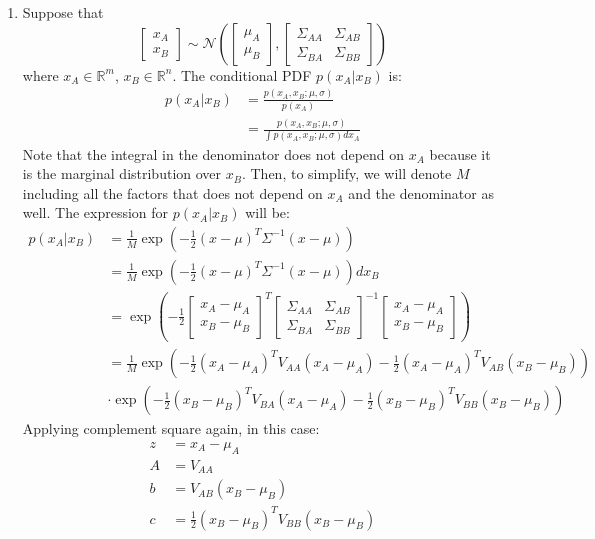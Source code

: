 \documentclass[a4paper, 10pt]{article}  %
\begin{document}
\begin{enumerate}[label=\textbf{(\alph*)}]
    
    \item Suppose that
    \[\left[ \begin{array}{c} x_A \\ x_B \end{array} \right] 
    \sim \mathcal{N} \left( \left[ \begin{array}{c} \mu_A \\ \mu_B \end{array} \right],
    \left[ \begin{array}{cc} \Sigma_{AA} & \Sigma_{AB}\\ \Sigma_{BA} & \Sigma_{BB}\end{array} \right]  \right)\]
    where $x_A \in \mathbb{R}^m$, $x_B \in \mathbb{R}^n$. The conditional PDF  $p(x_A | x_B)$ is:
    \begin{align*}
        p(x_A | x_B) &= \frac{p(x_A, x_B; \mu, \sigma)}{p(x_A)} \\
        &= \frac{p(x_A, x_B; \mu, \sigma)}{\int p(x_A, x_B; \mu, \sigma) d x_A}
    \end{align*}
    Note that the integral in the denominator does not depend on $x_A$ because it is the marginal distribution over $x_B$. Then, to simplify, we will denote $M$ including all the factors that does not depend on $x_A$ and the denominator as well. The expression for $p(x_A | x_B)$ will be:
    \begin{align*}
        p(x_A | x_B) &= \frac{1}{M} \exp(-\frac{1}{2} (x - \mu)^T \Sigma^{-1} (x - \mu))\\
        &= \frac{1}{M} \exp \left( -\frac{1}{2} (x - \mu)^T \Sigma^{-1} (x - \mu)\right) d x_B \\
        &= \exp \left( -\frac{1}{2} \left[ \begin{array}{c} x_A - \mu_A \\ x_B - \mu_B \end{array} \right]^T \left[ \begin{array}{cc}
            \Sigma_{AA} & \Sigma_{AB} \\
            \Sigma_{BA} & \Sigma_{BB}
        \end{array} \right]^{-1} \left[ \begin{array}{c} x_A - \mu_A \\ x_B - \mu_B \end{array} \right]\right) \\
        &= \frac{1}{M} \exp \left( -\frac{1}{2}(x_A - \mu_A)^T V_{AA} (x_A - \mu_A) -\frac{1}{2}(x_A - \mu_A)^T V_{AB} (x_B - \mu_B) \right) \\
        & \cdot \exp \left(-\frac{1}{2}(x_B - \mu_B)^T V_{BA} (x_A - \mu_A) -\frac{1}{2}(x_B - \mu_B)^T V_{BB} (x_B - \mu_B) \right)
    \end{align*}
    Applying complement square again, in this case:
    \begin{align*}
        z &= x_A - \mu_A \\
        A &= V_{AA} \\
        b &= V_{AB} (x_B - \mu_B) \\
        c &= \frac{1}{2} (x_B - \mu_B)^T V_{BB} (x_B - \mu_B)
    \end{align*}
    

\end{enumerate}
\end{document}
